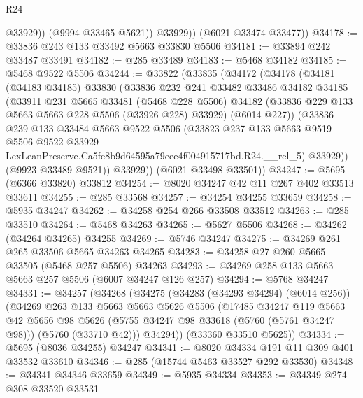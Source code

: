\begin{lexlean}{R24}
\begin{coremodule}
                @33929))
            (@9994 @33465 @5621))
          @33929))
      (@6021 @33474 @33477))
@34178 := @33836 @243 @133 @33492 @5663 @33830 @5506
@34181 := @33894 @242 @33487 @33491
@34182 := @285 @33489
@34183 := @5468 @34182
@34185 := @5468 @9522 @5506
@34244 := @33822
    (@33835
      (@34172
        (@34178
          (@34181
            (@34183 @34185)
            @33830
            (@33836
              @232
              @241
              @33482
              @33486
              @34182
              @34185
              (@33911
                @231
                @5665
                @33481
                (@5468 @228 @5506)
                @34182
                (@33836 @229 @133 @5663 @5663 @228 @5506 (@33926 @228) @33929)
                (@6014 @227))
              (@33836
                @239
                @133
                @33484
                @5663
                @9522
                @5506
                (@33823
                  @237
                  @133
                  @5663
                  @9519
                  @5506
                  @9522
                  @33929
                  LexLeanPreserve.Ca5fe8b9d64595a79eee4f004915717bd.R24.__rel_5)
                @33929))
            (@9923 @33489 @9521))
          @33929))
      (@6021 @33498 @33501))
@34247 := @5695 (@6366 @33820) @33812
@34254 := @8020 @34247 @42 @11 @267 @402 @33513 @33611
@34255 := @285 @33568
@34257 := @34254 @34255 @33659
@34258 := @5935 @34247
@34262 := @34258 @254 @266 @33508 @33512
@34263 := @285 @33510
@34264 := @5468 @34263
@34265 := @5627 @5506
@34268 := @34262 (@34264 @34265) @34255
@34269 := @5746 @34247
@34275 := @34269 @261 @265 @33506 @5665 @34263 @34265
@34283 := @34258 @27 @260 @5665 @33505 (@5468 @257 @5506) @34263
@34293 := @34269 @258 @133 @5663 @5663 @257 @5506 (@6007 @34247 @126 @257)
@34294 := @5768 @34247
@34331 := @34257
    (@34268
      (@34275
        (@34283 (@34293 @34294) (@6014 @256))
        (@34269
          @263
          @133
          @5663
          @5663
          @5626
          @5506
          (@17485
            @34247
            @119
            @5663
            @42
            @5656
            @98
            @5626
            (@5755 @34247 @98 @33618 (@5760 (@5761 @34247 @98)))
            (@5760 (@33710 @42)))
          @34294))
      (@33360 @33510 @5625))
@34334 := @5695 (@8036 @34255) @34247
@34341 := @8020 @34334 @191 @11 @309 @401 @33532 @33610
@34346 := @285 (@15744 @5463 @33527 @292 @33530)
@34348 := @34341 @34346 @33659
@34349 := @5935 @34334
@34353 := @34349 @274 @308 @33520 @33531

\end{coremodule}
\end{lexlean}
